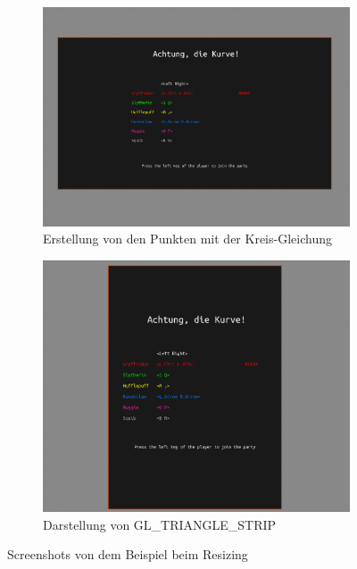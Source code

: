 \documentclass[doktyp=studarbeit]{TUBAFarbeiten}
\begin{document}
\begin{figure}[!htb]
    \centering
    \begin{subfigure}[b]{0.517\textwidth}
        \centering
        \includegraphics[width=1\linewidth]{aspect-ratio-1.png}
        \caption{Erstellung von den Punkten mit der Kreis-Gleichung}
    \end{subfigure}
    \begin{subfigure}[b]{0.45\textwidth}
        \centering
        \includegraphics[width=1\linewidth]{aspect-ratio-2.png}
        \caption{Darstellung von GL\_TRIANGLE\_STRIP}
    \end{subfigure}
    \caption{Screenshots von dem Beispiel beim Resizing}
	\label{fig:display-aspect-ratio}
\end{figure}
\end{document}

